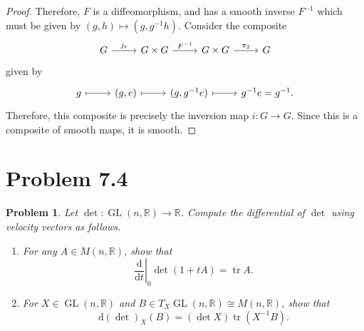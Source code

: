 \documentclass[11pt, letterpaper]{article}
\theoremstyle{plain}
\newtheorem{problem}{Problem}
\begin{document}
\begin{proof}
	Therefore, $F$ is a diffeomorphism, and has a smooth inverse $F^{-1} $ which must be given by $(g,h)\mapsto (g,g^{-1} h)$. Consider the composite
	\[\begin{tikzcd}[row sep = 2.5em, column sep = 2.5em]
	G \ar[" j_e ", r]  & G\times G \ar[" F^{-1}  ", r]  & G\times G \ar[" \pi _2 ", r]  & G
	\end{tikzcd}\]
	given by
	\[\begin{tikzcd}[row sep = 2.5em, column sep = 2.5em]
	g \ar[mapsto, r]  & (g,e) \ar[mapsto, r]  & (g,g^{-1} e) \ar[r, mapsto]  & g^{-1} e=g^{-1} .
	\end{tikzcd}\]
	Therefore, this composite is precisely the inversion map $i : G \to G$. Since this is a composite of smooth maps, it is smooth.
\end{proof}

\section{Problem 7.4}
\begin{problem}
	Let $\det : \operatorname{GL} (n,\mathbb{R} ) \to \mathbb{R} $. Compute the differential of $\det $ using velocity vectors as follows.
	\begin{enumerate}
		\item For any $A\in M(n,\mathbb{R} )$, show that
			\[
				\left. \frac{\mathrm{d}}{\mathrm{d}t} \right|_0 \det (1+tA)=\operatorname{tr} A
			.\]
		\item For $X\in \operatorname{GL} (n,\mathbb{R} )$ and $B\in T_X \operatorname{GL} (n,\mathbb{R} )\cong M(n,\mathbb{R} )$, show that
			\[
				\mathrm{d} (\det )_X(B)=(\det X)\operatorname{tr} (X ^{-1} B)
			.\]
	\end{enumerate}
\end{problem}
\end{document}
